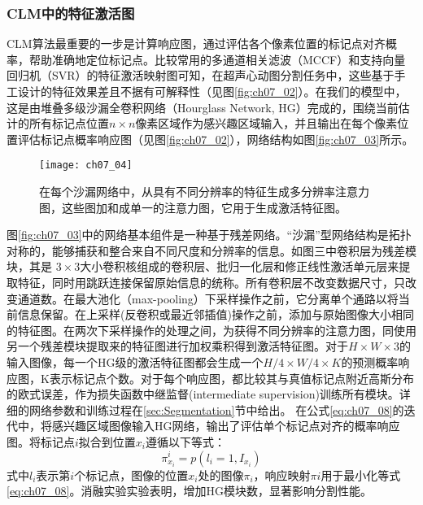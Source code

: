 \subsubsection{CLM中的特征激活图}
CLM算法最重要的一步是计算响应图，通过评估各个像素位置的标记点对齐概率，帮助准确地定位标记点。比较常用的多通道相关滤波（MCCF）\citep{Galoogahi2016}和支持向量回归机（SVR）\citep{Jan2017}的特征激活映射图可知，在超声心动图分割任务中，这些基于手工设计的特征效果差且不据有可解释性（见图\ref{fig:ch07_02}）。在我们的模型中，这是由堆叠多级沙漏全卷积网络（Hourglass Network, HG）\citep{Newell2016a}完成的，围绕当前估计的所有标记点位置$n\times n$像素区域作为感兴趣区域输入，并且输出在每个像素位置评估标记点概率响应图（见图\ref{fig:ch07_02}），网络结构如图\ref{fig:ch07_03}所示。
\begin{figure}[!htbp]
\centering
\texttt{[image: ch07\_04]}
\caption[具有不同分辨率的特征生成多分辨率注意力图]{在每个沙漏网络中，从具有不同分辨率的特征生成多分辨率注意力图，这些图加和成单一的注意力图，它用于生成激活特征图。}
\label{fig:ch07_04}
\end{figure} 
 

图\ref{fig:ch07_03}中的网络基本组件是一种基于残差网络\citep{he15}。“沙漏”型网络结构是拓扑对称的，能够捕获和整合来自不同尺度和分辨率的信息。如图三中卷积层为残差模块，其是 $3\times3$大小卷积核组成的卷积层、批归一化层和修正线性激活单元层来提取特征，同时用跳跃连接保留原始信息的统称。所有卷积层不改变数据尺寸，只改变通道数。在最大池化（max-pooling）下采样操作之前，它分离单个通路以将当前信息保留。在上采样(反卷积或最近邻插值)操作之前，添加与原始图像大小相同的特征图。在两次下采样操作的处理之间，为获得不同分辨率的注意力图\citep{Chu2017}，同使用另一个残差模块提取来的特征图进行加权乘积得到激活特征图。对于$H\times W\times 3$的输入图像，每一个HG级的激活特征图都会生成一个$H/4 \times W/4\times K$的预测概率响应图，K表示标记点个数。对于每个响应图，都比较其与真值标记点附近高斯分布的欧式误差，作为损失函数中继监督(intermediate supervision)训练所有模块。详细的网络参数和训练过程在\ref{sec:Segmentation}节中给出。
在公式\ref{eq:ch07_08}的迭代中，将感兴趣区域图像输入HG网络，输出了评估单个标记点对齐的概率响应图。将标记点$i$拟合到位置$x_i$遵循以下等式： 
\begin{equation}\label{eq:ch07_10}
    \pi_{x_i}^{i}= p(l_i=1,I_{x_i})
 \end{equation} 
式中$l_i$表示第$i$个标记点，图像的位置$x_i$处的图像$\pi _i$，响应映射$πi$用于最小化等式\ref{eq:ch07_08}。消融实验实验表明，增加HG模块数，显著影响分割性能。

